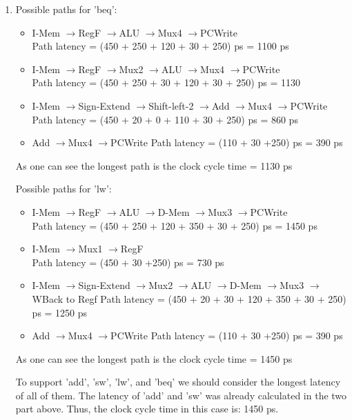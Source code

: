 \documentclass[a4paper]{article}
\renewcommand{\textrightarrow}{$\rightarrow$}
\begin{document}
\begin{enumerate}[label=(\alph*)]
	\item Possible paths for 'beq':
	\begin{itemize}
		\item I-Mem \textrightarrow RegF \textrightarrow ALU \textrightarrow Mux4 \textrightarrow PCWrite\\
		Path latency = (450 + 250 + 120 + 30 + 250) ps = 1100 ps
		\item I-Mem \textrightarrow RegF \textrightarrow Mux2 \textrightarrow ALU \textrightarrow Mux4 \textrightarrow PCWrite\\
		Path latency = (450 + 250 + 30 + 120 + 30 + 250) ps = 1130
		\item I-Mem \textrightarrow Sign-Extend \textrightarrow Shift-left-2 \textrightarrow Add \textrightarrow Mux4 \textrightarrow PCWrite\\
		Path latency = (450 + 20 + 0 + 110 + 30 + 250) ps = 860 ps
		\item Add \textrightarrow Mux4 \textrightarrow PCWrite 
		Path latency = (110 + 30 +250) ps = 390 ps
	\end{itemize}
	As one can see the longest path is the clock cycle time = 1130 ps
	
	Possible paths for 'lw':
	\begin{itemize}
		\item I-Mem \textrightarrow RegF \textrightarrow ALU \textrightarrow D-Mem \textrightarrow Mux3 \textrightarrow PCWrite\\
		Path latency = (450 + 250 + 120 + 350 + 30 + 250) ps = 1450 ps
		\item I-Mem \textrightarrow Mux1 \textrightarrow RegF\\
		Path latency = (450 + 30 +250) ps = 730 ps
		\item I-Mem \textrightarrow Sign-Extend \textrightarrow Mux2 \textrightarrow ALU \textrightarrow D-Mem \textrightarrow Mux3 \textrightarrow WBack to Regf
		Path latency = (450 + 20 + 30 + 120 + 350 + 30 + 250) ps = 1250 ps
		\item Add \textrightarrow Mux4 \textrightarrow PCWrite 
		Path latency = (110 + 30 +250) ps = 390 ps
	\end{itemize}
	As one can see the longest path is the clock cycle time = 1450 ps
	
	
	To support 'add', 'sw', 'lw', and 'beq' we should consider the longest latency of all of them. The latency of 'add' and 'sw' was already calculated in the two part above. Thus, the clock cycle time in this case is: 1450 ps.
\end{enumerate}
\end{document}
